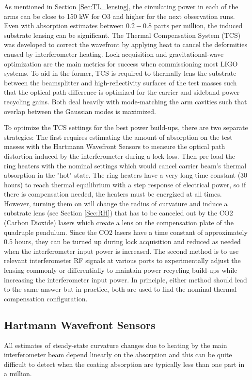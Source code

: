 	As mentioned in Section \ref{Sec:TL_lensing}, the circulating power in each of the arms can be close to 150 kW for O3 and higher for the next observation runs.  Even with absorption estimates between $0.2-0.8$ parts per million, the induced substrate lensing can be significant.  The Thermal Compensation System (TCS) \cite{Lawrence_TCS} \cite{AWC_current} was developed to correct the wavefront by applying heat to cancel the deformities caused by interferometer heating.  Lock acquisition and gravitational-wave optimization are the main metrics for success when commissioning most LIGO systems.  To aid in the former, TCS is required to thermally lens the substrate between the beamsplitter and high-reflectivity surfaces of the test masses such that the optical path difference is optimized for the carrier and sideband power recycling gains.  Both deal heavily with mode-matching the arm cavities such that overlap between the Gaussian modes is maximized.
	
	To optimize the TCS settings for the best power build-ups, there are two separate strategies:  The first requires estimating the amount of absorption on the test masses with the Hartmann Wavefront Sensors to measure the optical path distortion induced by the interferometer during a lock loss.  Then pre-load the ring heaters with the nominal settings which would cancel carrier beam's thermal absorption in the "hot" state.  The ring heaters have a very long time constant (30 hours) to reach thermal equilibrium with a step response of electrical power, so if there is compensation needed, the heaters must be energized at all times.    However, turning them on will change the radius of curvature and induce a substrate lens (see Section \ref{Sec:RH}) that has to be canceled out by the CO2 (Carbon Dioxide) lasers which create a lens on the compensation plate of the quadruple pendulum.  Since the CO2 lasers have a time constant of approximately 0.5 hours, they can be turned up during lock acquisition and reduced as needed when the interferometer input power is increased. The second method is to use relevant interferometer RF signals at various ports to experimentally adjust the lensing commonly or differentially to maintain power recycling build-ups while increasing the interferometer input power.  In principle, either method should lead to the same answer but in practice, both are used to find the nominal thermal compensation configuration.
	\subsection{Hartmann Wavefront Sensors}\label{Sec:HWS}
	All estimates of steady-state curvature changes due to heating by the main interferometer beam depend linearly on the absorption and this can be quite difficult to detect when the coating absorption are typically less than one part in a million.
	
